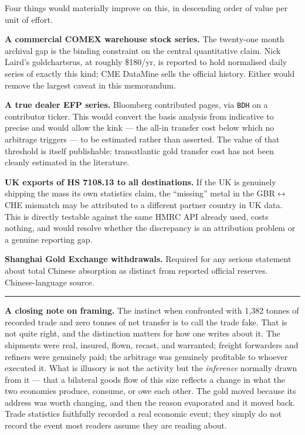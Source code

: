 \documentclass[11pt,a4paper]{article}
\begin{document}
Four things would materially improve on this, in descending order of value per unit of effort.

\textbf{A commercial COMEX warehouse stock series.} The twenty-one month archival gap is the
binding constraint on the central quantitative claim. Nick Laird's goldchartsrus, at roughly
\$180/yr, is reported to hold normalised daily series of exactly this kind; CME DataMine sells
the official history. Either would remove the largest caveat in this memorandum.

\textbf{A true dealer EFP series.} Bloomberg contributed pages, via
\texttt{BDH} on a contributor ticker. This would convert the basis analysis from indicative to
precise and would allow the kink --- the all-in transfer cost below which no arbitrage triggers
--- to be estimated rather than asserted. The value of that threshold is itself publishable:
transatlantic gold transfer cost has not been cleanly estimated in the literature.

\textbf{UK exports of HS 7108.13 to all destinations.} If the UK is genuinely shipping the mass
its own statistics claim, the ``missing'' metal in the GBR$\leftrightarrow$CHE mismatch may be
attributed to a different partner country in UK data. This is directly testable against the
same HMRC API already used, costs nothing, and would resolve whether the discrepancy is an
attribution problem or a genuine reporting gap.

\textbf{Shanghai Gold Exchange withdrawals.} Required for any serious statement about total
Chinese absorption as distinct from reported official reserves. Chinese-language source.

\vspace{1em}
\hrule
\vspace{0.5em}

\small
\noindent\textbf{A closing note on framing.} The instinct when confronted with 1{,}382 tonnes of
recorded trade and zero tonnes of net transfer is to call the trade fake. That is not quite
right, and the distinction matters for how one writes about it. The shipments were real,
insured, flown, recast, and warranted; freight forwarders and refiners were genuinely paid;
the arbitrage was genuinely profitable to whoever executed it. What is illusory is not the
activity but the \emph{inference} normally drawn from it --- that a bilateral goods flow of this
size reflects a change in what the two economies produce, consume, or owe each other. The gold
moved because its address was worth changing, and then the reason evaporated and it moved back.
Trade statistics faithfully recorded a real economic event; they simply do not record the event
most readers assume they are reading about.
\end{document}
